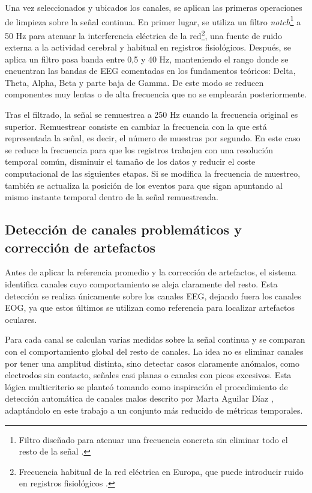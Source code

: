 Una vez seleccionados y ubicados los canales, se aplican las primeras operaciones de limpieza sobre la señal continua. En primer lugar, se utiliza un filtro \textit{notch}\footnote{Filtro diseñado para atenuar una frecuencia concreta sin eliminar todo el resto de la señal \cite{wikipediaBandStopFilter}.} a 50 Hz para atenuar la interferencia eléctrica de la red\footnote{Frecuencia habitual de la red eléctrica en Europa, que puede introducir ruido en registros fisiológicos \cite{wikipediaUtilityFrequency}.}, una fuente de ruido externa a la actividad cerebral y habitual en registros fisiológicos. Después, se aplica un filtro pasa banda entre 0,5 y 40 Hz, manteniendo el rango donde se encuentran las bandas de \ac{EEG} comentadas en los fundamentos teóricos: Delta, Theta, Alpha, Beta y parte baja de Gamma. De este modo se reducen componentes muy lentas o de alta frecuencia que no se emplearán posteriormente.


Tras el filtrado, la señal se remuestrea a 250 Hz cuando la frecuencia original es superior. Remuestrear consiste en cambiar la frecuencia con la que está representada la señal, es decir, el número de muestras por segundo. En este caso se reduce la frecuencia para que los registros trabajen con una resolución temporal común, disminuir el tamaño de los datos y reducir el coste computacional de las siguientes etapas. Si se modifica la frecuencia de muestreo, también se actualiza la posición de los eventos para que sigan apuntando al mismo instante temporal dentro de la señal remuestreada.

\subsection{Detección de canales problemáticos y corrección de artefactos}

Antes de aplicar la referencia promedio y la corrección de artefactos, el sistema identifica canales cuyo comportamiento se aleja claramente del resto. Esta detección se realiza únicamente sobre los canales \ac{EEG}, dejando fuera los canales \ac{EOG}, ya que estos últimos se utilizan como referencia para localizar artefactos oculares.

Para cada canal se calculan varias medidas sobre la señal continua y se comparan con el comportamiento global del resto de canales. La idea no es eliminar canales por tener una amplitud distinta, sino detectar casos claramente anómalos, como electrodos sin contacto, señales casi planas o canales con picos excesivos. Esta lógica multicriterio se planteó tomando como inspiración el procedimiento de detección automática de canales malos descrito por Marta Aguilar Díaz \cite{aguilar2026eeg}, adaptándolo en este trabajo a un conjunto más reducido de métricas temporales.

